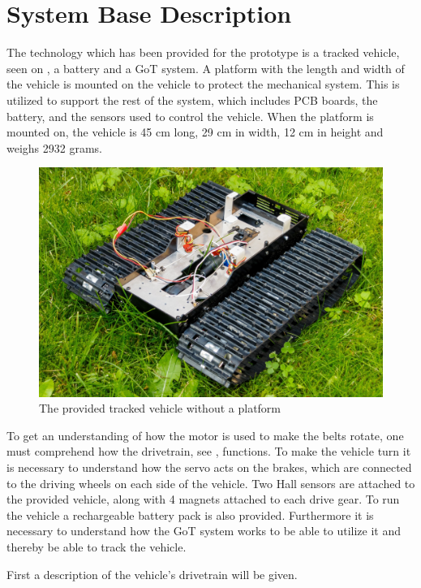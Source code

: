 \section{System Base Description}
\label{sec:Vehicledescription}
The technology which has been provided for the prototype is a tracked vehicle, seen on , a battery and a GoT system. A platform with the length and width of the vehicle is mounted on the vehicle to protect the mechanical system. This is utilized to support the rest of the system, which includes PCB boards, the battery, and the sensors used to control the vehicle. When the platform is mounted on, the vehicle is 45 cm long, 29 cm in width, 12 cm in height and weighs 2932 grams.
%
\begin{figure}[H]
	\centering
	\includegraphics[scale=0.6]{figures/BeltVehicle.jpg}
	\caption{The provided tracked vehicle without a platform}
	\label{TrackedVehicle}
\end{figure}
%
To get an understanding of how the motor is used to make the belts rotate, one must comprehend how the drivetrain, see , functions. To make the vehicle turn it is necessary to understand how the servo acts on the brakes, which are connected to the driving wheels on each side of the vehicle. Two Hall sensors are attached to the provided vehicle, along with 4 magnets attached to each drive gear. To run the vehicle a rechargeable battery pack is also provided. Furthermore it is necessary to understand how the GoT system works to be able to utilize it and thereby be able to track the vehicle.

First a description of the vehicle's drivetrain will be given.